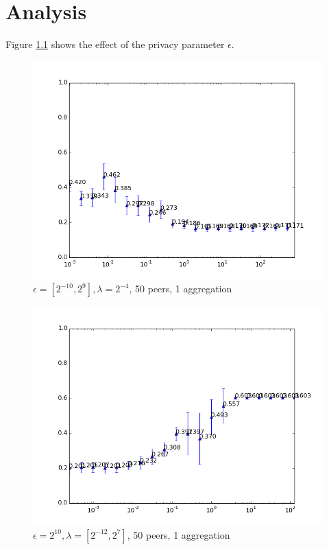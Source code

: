 
\chapter{Analysis}

Figure \ref{fig:epsilon_big_range} shows the effect of the privacy parameter $\epsilon$.

\begin{figure}[h!]
	\centering
	\includegraphics[width=\textwidth]{fig/eps2e-10-2e9,bud=eps,peers50,groups50,reg2e-4}
 	\caption{$\epsilon = [2^{-10}, 2^{9}], \lambda = 2^{-4}$, 50 peers, 1 aggregation}
 	\label{fig:epsilon_big_range}
\end{figure}
 

 
\begin{figure}[h!]
	\centering
	\includegraphics[width=\textwidth]{fig/eps2e10.0,bud2e10.0,peers10,groups5,reg2e-12-2e7}
	\caption{$\epsilon = 2^{10}, \lambda = [2^{-12}, 2^{7}]$, 50 peers, 1 aggregation}
	\label{fig:regularization_extremelyhighepsilon}
\end{figure}

